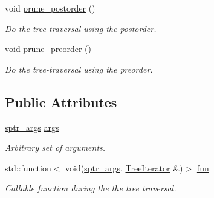 \begin{DoxyCompactItemize}
\item 
void \hyperlink{classTree_a7d465880d18acf79f3a772ea5412b0d7}{prune\+\_\+postorder} ()
\begin{DoxyCompactList}\small\item\em Do the tree-\/traversal using the postorder. \end{DoxyCompactList}\item 
void \hyperlink{classTree_ac85bfb083b3856e65987e1d15885a61c}{prune\+\_\+preorder} ()
\begin{DoxyCompactList}\small\item\em Do the tree-\/traversal using the preorder. \end{DoxyCompactList}\end{DoxyCompactItemize}
\subsection*{Public Attributes}
\begin{DoxyCompactItemize}
\item 
\hyperlink{typedefs_8h_a36d9dc9d55255609cd5999fe2a705730}{sptr\+\_\+args} \hyperlink{classTree_a115276dfa96383736e591b150ace3f8a}{args}\hypertarget{classTree_a115276dfa96383736e591b150ace3f8a}{}\label{classTree_a115276dfa96383736e591b150ace3f8a}

\begin{DoxyCompactList}\small\item\em Arbitrary set of arguments. \end{DoxyCompactList}\item 
std\+::function$<$ void(\hyperlink{typedefs_8h_a36d9dc9d55255609cd5999fe2a705730}{sptr\+\_\+args}, \hyperlink{classTreeIterator}{Tree\+Iterator} \&)$>$ \hyperlink{classTree_ae70c3a427f2c5cee0d4dac4903df57e6}{fun}
\begin{DoxyCompactList}\small\item\em Callable function during the the tree traversal. \end{DoxyCompactList}\end{DoxyCompactItemize}
